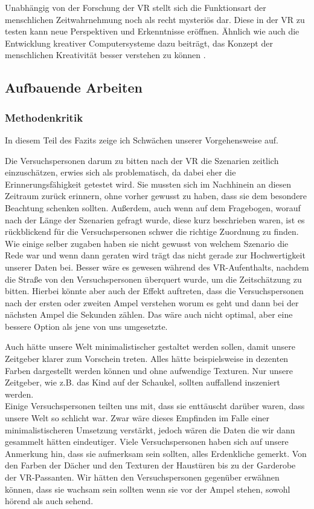 \documentclass{Bericht}
\begin{document}
Unabhängig von der Forschung der VR stellt sich die Funktionsart der menschlichen Zeitwahrnehmung noch als recht mysteriös dar\cite{unerforscht}. Diese in der VR zu testen kann neue Perspektiven und Erkenntnisse eröffnen. Ähnlich wie auch die Entwicklung kreativer Computersysteme dazu beiträgt, das Konzept der menschlichen Kreativität besser verstehen zu können \cite{comp}.

\subsection{Aufbauende Arbeiten}
\subsubsection{Methodenkritik}
In diesem Teil des Fazits zeige ich Schwächen unserer Vorgehensweise auf.

Die Versuchspersonen darum zu bitten nach der VR die Szenarien zeitlich einzuschätzen, erwies sich als problematisch, da dabei eher die Erinnerungsfähigkeit getestet wird. Sie mussten sich im Nachhinein an diesen Zeitraum zurück erinnern, ohne vorher gewusst zu haben, dass sie dem besondere Beachtung schenken sollten. Außerdem, auch wenn auf dem Fragebogen, worauf nach der Länge der Szenarien gefragt wurde, diese kurz beschrieben waren, ist es rückblickend für die Versuchspersonen schwer die richtige Zuordnung zu finden. Wie einige selber zugaben haben sie nicht gewusst von welchem Szenario die Rede war und wenn dann geraten wird trägt das nicht gerade zur Hochwertigkeit unserer Daten bei. Besser wäre es gewesen während des VR-Aufenthalts, nachdem die Straße von den Versuchspersonen überquert wurde, um die Zeitschätzung zu bitten. Hierbei könnte aber auch der Effekt auftreten, dass die Versuchspersonen nach der ersten oder zweiten Ampel verstehen worum es geht und dann bei der nächsten Ampel die Sekunden zählen. Das wäre auch nicht optimal, aber eine bessere Option als jene von uns umgesetzte.

Auch hätte unsere Welt minimalistischer gestaltet werden sollen, damit unsere Zeitgeber klarer zum Vorschein treten. Alles hätte beispielsweise in dezenten Farben dargestellt werden können und ohne aufwendige Texturen. Nur unsere Zeitgeber, wie z.B. das Kind auf der Schaukel, sollten auffallend inszeniert werden. \\Einige Versuchspersonen teilten uns mit, dass sie enttäuscht darüber waren, dass unsere Welt so schlicht war. Zwar wäre dieses Empfinden im Falle einer minimalistischeren Umsetzung verstärkt, jedoch wären die Daten die wir dann gesammelt hätten eindeutiger. Viele Versuchspersonen haben sich auf unsere Anmerkung hin, dass sie aufmerksam sein sollten, alles Erdenkliche gemerkt. Von den Farben der Dächer und den Texturen der Haustüren bis zu der Garderobe der VR-Passanten. Wir hätten den Versuchspersonen gegenüber erwähnen können, dass sie wachsam sein sollten wenn sie vor der Ampel stehen, sowohl hörend als auch sehend.
\end{document}
